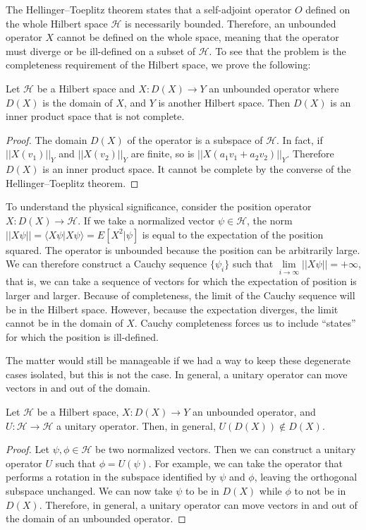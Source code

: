 \documentclass[10pt,twocolumn, nofootinbib]{revtex4-2}
\def\>{\rangle}
\def\<{\langle}
\begin{document}
The Hellinger–Toeplitz theorem states that a self-adjoint operator $O$ defined on the whole Hilbert space $\mathcal{H}$ is necessarily bounded. Therefore, an unbounded operator $X$ cannot be defined on the whole space, meaning that the operator must diverge or be ill-defined on a subset of $\mathcal{H}$. To see that the problem is the completeness requirement of the Hilbert space, we prove the following:
\begin{prop}
Let $\mathcal{H}$ be a Hilbert space and $X : D(X) \to Y$ an unbounded operator where $D(X)$ is the domain of $X$, and $Y$ is another Hilbert space. Then $D(X)$ is an inner product space that is not complete.
\end{prop}
\begin{proof}
The domain $D(X)$ of the operator is a subspace of $\mathcal{H}$. In fact, if $||X(v_1)||_Y$ and $||X(v_2)||_Y$ are finite, so is $||X(a_1 v_1+a_2v_2)||_Y$. Therefore $D(X)$ is an inner product space. It cannot be complete by the converse of the Hellinger–Toeplitz theorem.
\end{proof}

To understand the physical significance, consider the position operator $X : D(X) \to \mathcal{H}$. If we take a normalized vector $\psi \in \mathcal{H}$, the norm $||X\psi|| = \<X\psi|X\psi\> = E[X^2|\psi]$ is equal to the expectation of the position squared. The operator is unbounded because the position can be arbitrarily large. We can therefore construct a Cauchy sequence $\{\psi_i\}$ such that $\lim\limits_{i \to \infty}||X\psi|| = +\infty$, that is, we can take a sequence of vectors for which the expectation of position is larger and larger. Because of completeness, the limit of the Cauchy sequence will be in the Hilbert space. However, because the expectation diverges, the limit cannot be in the domain of $X$. Cauchy completeness forces us to include ``states'' for which the position is ill-defined.

The matter would still be manageable if we had a way to keep these degenerate cases isolated, but this is not the case. In general, a unitary operator can move vectors in and out of the domain.
\begin{prop}
Let $\mathcal{H}$ be a Hilbert space, $X : D(X) \to Y$ an unbounded operator, and $U : \mathcal{H} \to \mathcal{H}$ a unitary operator. Then, in general, $U(D(X)) \notin D(X)$.
\end{prop}
\begin{proof}
Let $\psi, \phi \in \mathcal{H}$ be two normalized vectors. Then we can construct a unitary operator $U$ such that $\phi = U(\psi)$. For example, we can take the operator that performs a rotation in the subspace identified by $\psi$ and $\phi$, leaving the orthogonal subspace unchanged. We can now take $\psi$ to be in $D(X)$ while $\phi$ to not be in $D(X)$. Therefore, in general, a unitary operator can move vectors in and out of the domain of an unbounded operator.
\end{proof}
\end{document}
